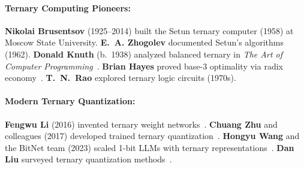 \documentclass[aps,prd,preprint,superscriptaddress,showpacs,nofootinbib,longbibliography]{revtex4-2}
\begin{document}
\paragraph{Ternary Computing Pioneers:}
\textbf{Nikolai Brusentsov} (1925--2014) built the Setun ternary computer (1958) at Moscow State University. \textbf{E.~A. Zhogolev} documented Setun's algorithms (1962). \textbf{Donald Knuth} (b.~1938) analyzed balanced ternary in \textit{The Art of Computer Programming}~\cite{knuth1997}. \textbf{Brian Hayes} proved base-3 optimality via radix economy~\cite{hayes2001}. \textbf{T.~N.~Rao} explored ternary logic circuits (1970s).

\paragraph{Modern Ternary Quantization:}
\textbf{Fengwu Li} (2016) invented ternary weight networks~\cite{li2016}. \textbf{Chuang Zhu} and colleagues (2017) developed trained ternary quantization~\cite{zhu2017}. \textbf{Hongyu Wang} and the BitNet team (2023) scaled 1-bit LLMs with ternary representations~\cite{wang2023}. \textbf{Dan Liu} surveyed ternary quantization methods~\cite{liu2023}.
\end{document}
